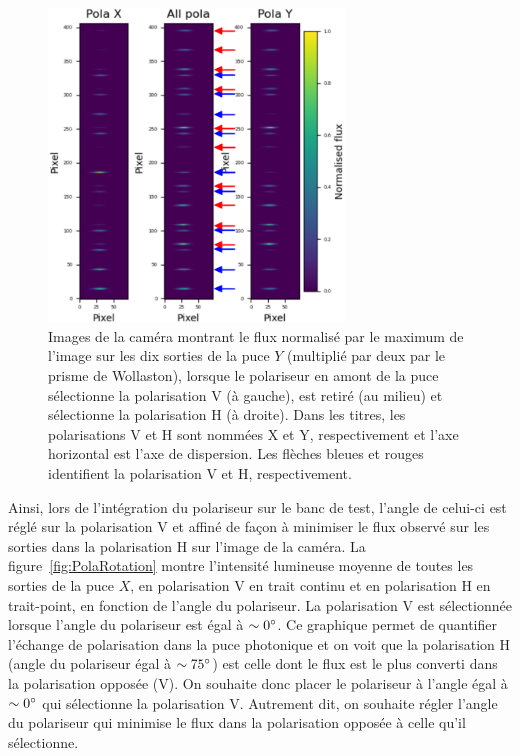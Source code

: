 \begin{figure}[ht!]
    \centering
    \includegraphics[width=0.7\textwidth]{Figure_Chap2/20210707_PolaComparison_PolId.png}
    \caption[Images de la caméra montrant le flux sur les dix sorties de la puce $Y$ dans les deux polarisations.]{Images de la caméra montrant le flux normalisé par le maximum de l'image sur les dix sorties de la puce $Y$ (multiplié par deux par le prisme de Wollaston), lorsque le polariseur en amont de la puce sélectionne la polarisation V (à gauche), est retiré (au milieu) et sélectionne la polarisation H (à droite). Dans les titres, les polarisations V et H sont nommées X et Y, respectivement et l'axe horizontal est l'axe de dispersion. Les flèches bleues et rouges identifient la polarisation V et H, respectivement.}
    \label{fig:PolaComparison}
\end{figure}

Ainsi, lors de l'intégration du polariseur sur le banc de test, l'angle de celui-ci est réglé sur la polarisation V et affiné de façon à minimiser le flux observé sur les sorties dans la polarisation H sur l'image de la caméra. La figure~\ref{fig:PolaRotation} montre l'intensité lumineuse moyenne de toutes les sorties de la puce $X$, en polarisation V en trait continu et en polarisation H en trait-point, en fonction de l'angle du polariseur. La polarisation V est sélectionnée lorsque l'angle du polariseur est égal à $\sim 0^{\circ}$. Ce graphique permet de quantifier l'échange de polarisation  dans la puce photonique et on voit que la polarisation H (angle du polariseur égal à $\sim 75^{\circ}$) est celle dont le flux est le plus converti dans la polarisation opposée (V). On souhaite donc placer le polariseur à l'angle égal à $\sim 0^{\circ}$ qui sélectionne la polarisation V. Autrement dit, on souhaite régler l'angle du polariseur qui minimise le flux dans la polarisation opposée à celle qu'il sélectionne.

